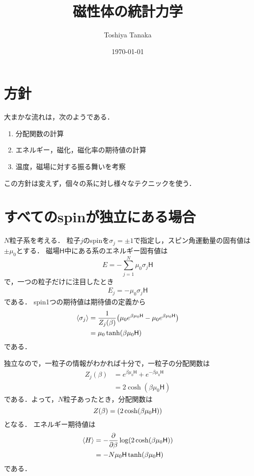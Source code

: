 \documentclass[dvipdfmx, a4paper]{jsarticle}
\title{磁性体の統計力学}
\author{Toshiya Tanaka}
\date{\today}
\theoremstyle{break}
\newcommand{\mf}{\mathsf{H}}
\begin{document}
	\maketitle

	\section{方針}
	大まかな流れは，次のようである．
	\begin{enumerate}
			\item 分配関数の計算
			\item エネルギー，磁化，磁化率の期待値の計算
			\item 温度，磁場に対する振る舞いを考察
	\end{enumerate}
	この方針は変えず，個々の系に対し様々なテクニックを使う．

	\section{すべてのspinが独立にある場合}
	$N$粒子系を考える．
	粒子$j$のspinを$\sigma_j = \pm 1$で指定し，スピン角運動量の固有値は$\pm\mu_0$とする．
	磁場$\mf$中にある系のエネルギー固有値は
	\begin{equation}
			E = -\sum_{j=1}^{N}\mu_0\sigma_j\mf
	\end{equation}
	で，一つの粒子だけに注目したとき
	\begin{align}
			E_j = -\mu_0\sigma_j\mf
	\end{align}
	である．
	spin1つの期待値は期待値の定義から
	\begin{align}
			\expval{\sigma_j} &= \frac{1}{Z_j(\beta)}\qty(\mu_0e^{\beta\mu_0\mf} - \mu_0e^{\beta\mu_0\mf})\\
							  &= \mu_0\tanh(\beta\mu_0\mf)\label{eq:onespin}
	\end{align}
	である．

	独立なので，一粒子の情報がわかれば十分で，一粒子の分配関数は
	\begin{align}
			Z_j(\beta) &= e^{\beta\mu_0\mf} + e^{-\beta\mu_0\mf}\\
				&= 2\cosh(\beta\mu_0\mf)
	\end{align}
	である．よって，$N$粒子あったとき，分配関数は
	\begin{equation}
			Z(\beta) = \qty(2\cosh(\beta\mu_0\mf))
	\end{equation}
	となる．
	エネルギー期待値は
	\begin{align}
			\langle H\rangle &= -\pdv{}{\beta}\log(2\cosh(\beta\mu_0\mf))\\
							 &= -N\mu_0\mf\tanh(\beta\mu_0\mf)
	\end{align}
	である．
\end{document}
